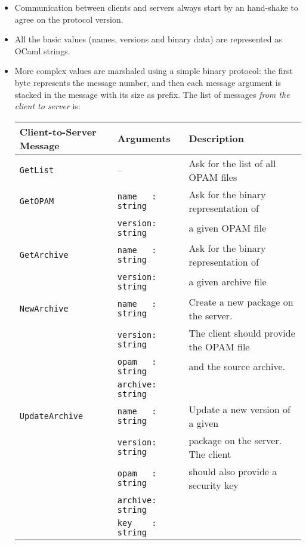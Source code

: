 \documentclass[a4paper,11pt]{article}
\begin{document}
\begin{itemize}

\item Communication between clients and servers always start by an
hand-shake to agree on the protocol version.

\item All the basic values (names, versions and binary data) are
  represented as OCaml strings.

\item More complex values are marshaled using a simple binary
  protocol: the first byte represents the message number, and then
  each message argument is stacked in the message with its size as
  prefix. The list of messages {\em from the client to server} is:

{\small
\begin{tabular}{|l|l|l|}
\hline
Client-to-Server Message & Arguments & Description \\
\hline
\hline
\verb+GetList+ & -- & Ask for the list of all OPAM files \\
\hline
\verb+GetOPAM+ & \verb+name   : string+ & Ask for the binary representation of \\
               & \verb+version: string+ & a given OPAM file \\
\hline
\verb+GetArchive+ & \verb+name   : string+ & Ask for the binary representation of \\
                  & \verb+version: string+ & a given archive file \\
\hline
\verb+NewArchive+ & \verb+name   : string+ & Create a new package on the
server. \\
                  & \verb+version: string+ & The client should provide
the OPAM file \\
                  & \verb+opam   : string+ & and the source archive. \\
                  & \verb+archive: string+ & \\
\hline
\verb+UpdateArchive+ &  \verb+name   : string+ & Update a new version
of a given \\
                  & \verb+version: string+ & package on the
server. The client \\
                  & \verb+opam   : string+ & should also provide a security key\\
                  & \verb+archive: string+ & \\
                  & \verb+key    : string+ & \\
\hline
\end{tabular}
}


\end{itemize}
\end{document}
